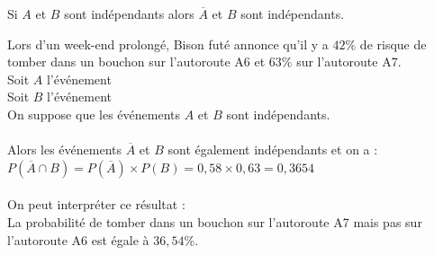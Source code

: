\begin{propriete}
	Si $A$ et $B$ sont indépendants alors $\overline{A}$ et $B$ sont indépendants.
\end{propriete}


\begin{exemple}
	Lors d'un week-end prolongé, Bison futé annonce qu'il y a $42\%$ de risque de tomber dans un bouchon sur l'autoroute A6 et $63\%$ sur l'autoroute A7.\\
	Soit $A$ l'événement \\
	Soit $B$ l'événement \\
	On suppose que les événements $A$ et $B$ sont indépendants.\\
	\\
	Alors les événements $\overline{A}$ et $B$ sont également indépendants et on a :\\
	$P(\overline{A} \cap B)=P(\overline{A})\times P(B)=0,58\times 0,63=0,3654$\\
	\\
	On peut interpréter ce résultat : \\
	La probabilité de tomber dans un bouchon sur l'autoroute A7 mais pas sur l'autoroute A6 est égale à $36,54\%$.
\end{exemple}

